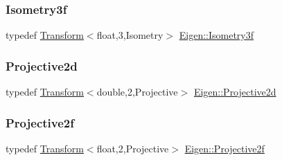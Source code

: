 \mbox{\label{group___geometry___module_gad3de6a5dfd9da64bf0970995f9cbc032}} 
\subsubsection{\texorpdfstring{Isometry3f}{Isometry3f}}
{\footnotesize\ttfamily typedef \mbox{\hyperlink{class_eigen_1_1_transform}{Transform}}$<$float,3,Isometry$>$ \mbox{\hyperlink{group___geometry___module_gad3de6a5dfd9da64bf0970995f9cbc032}{Eigen\+::\+Isometry3f}}}

\mbox{\label{group___geometry___module_gad3b2e23c2704a22c957573bcaa362d2a}} 
\subsubsection{\texorpdfstring{Projective2d}{Projective2d}}
{\footnotesize\ttfamily typedef \mbox{\hyperlink{class_eigen_1_1_transform}{Transform}}$<$double,2,Projective$>$ \mbox{\hyperlink{group___geometry___module_gad3b2e23c2704a22c957573bcaa362d2a}{Eigen\+::\+Projective2d}}}

\mbox{\label{group___geometry___module_ga20f7da72f3045561b8cf2dfaceed797f}} 
\subsubsection{\texorpdfstring{Projective2f}{Projective2f}}
{\footnotesize\ttfamily typedef \mbox{\hyperlink{class_eigen_1_1_transform}{Transform}}$<$float,2,Projective$>$ \mbox{\hyperlink{group___geometry___module_ga20f7da72f3045561b8cf2dfaceed797f}{Eigen\+::\+Projective2f}}}

\mbox{\label{group___geometry___module_ga3d2c61fbea04b09e4925a2e321b8b67c}} 
